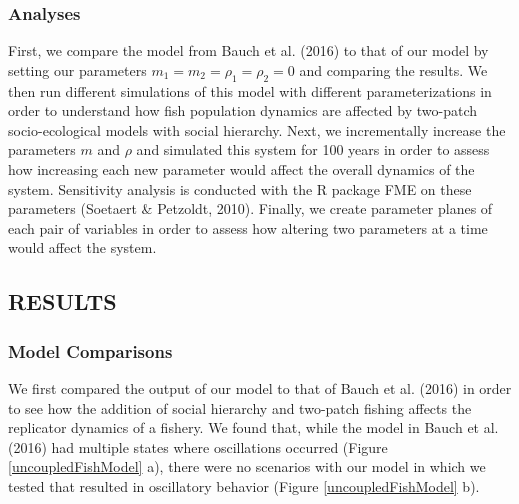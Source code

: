 \documentclass[
  12pt,
]{article}
\begin{document}
\hypertarget{analyses}{%
\subsubsection{Analyses}\label{analyses}}

First, we compare the model from Bauch et al. (2016) to that of our model by setting our parameters \(m_1 = m_2 = \rho_1 = \rho_2 = 0\) and comparing the results. We then run different simulations of this model with different parameterizations in order to understand how fish population dynamics are affected by two-patch socio-ecological models with social hierarchy. Next, we incrementally increase the parameters \(m\) and \(\rho\) and simulated this system for 100 years in order to assess how increasing each new parameter would affect the overall dynamics of the system. Sensitivity analysis is conducted with the R package FME on these parameters (Soetaert \& Petzoldt, 2010). Finally, we create parameter planes of each pair of variables in order to assess how altering two parameters at a time would affect the system.

\hypertarget{results-1}{%
\subsection{RESULTS}\label{results-1}}

\hypertarget{model-comparisons}{%
\subsubsection{Model Comparisons}\label{model-comparisons}}

We first compared the output of our model to that of Bauch et al. (2016) in order to see how the addition of social hierarchy and two-patch fishing affects the replicator dynamics of a fishery. We found that, while the model in Bauch et al. (2016) had multiple states where oscillations occurred (Figure \ref{uncoupledFishModel} a), there were no scenarios with our model in which we tested that resulted in oscillatory behavior (Figure \ref{uncoupledFishModel} b).
\end{document}
